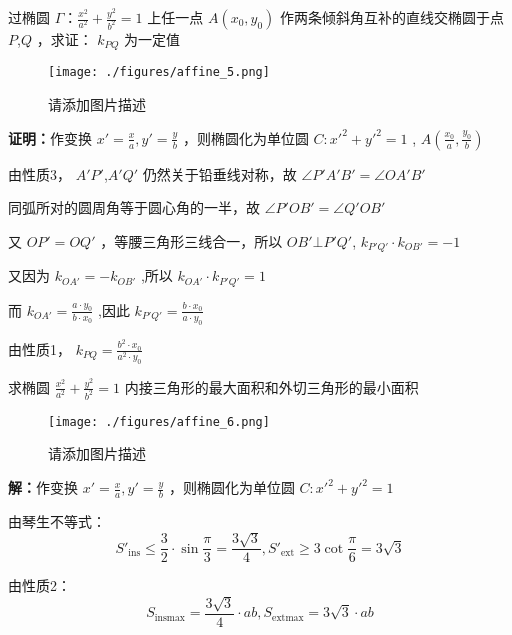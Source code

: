 \begin{corollary}{}
过椭圆 $\displaystyle{\Gamma：\frac{x^2}{a^2}+\frac{y^2}{b^2}=1}$ 上任一点 $\displaystyle{A(x_0,y_0)}$ 作两条倾斜角互补的直线交椭圆于点 $\displaystyle{P}$,$\displaystyle{Q}$ ，求证： $\displaystyle{k_{PQ}}$ 为一定值
\begin{figure}[ht]
\centering
\texttt{[image: ./figures/affine\_5.png]}
\caption{请添加图片描述} \label{affine_fig5}
\end{figure}
\textbf{证明：}作变换 $\displaystyle{x'=\frac{x}{a},y'=\frac{y}{b}}$ ，则椭圆化为单位圆 $\displaystyle{C:x'^2+y'^2=1}$ , $\displaystyle{A\left(\frac{x_0}{a},\frac{y_0}{b}\right)}$ 

由性质3， $\displaystyle{A'P'}$,$\displaystyle{A'Q'}$ 仍然关于铅垂线对称，故 $\displaystyle{\angle P'A'B'=\angle OA'B'}$

同弧所对的圆周角等于圆心角的一半，故 $\displaystyle{\angle P'OB'=\angle Q'OB'}$

又 $\displaystyle{OP'=OQ'}$ ，等腰三角形三线合一，所以 $\displaystyle{OB'\bot P'Q' }$, $\displaystyle{k_{P'Q'}\cdot k_{OB'}=-1}$

又因为 $\displaystyle{k_{OA'}=-k_{OB'}}$ ,所以 $\displaystyle{k_{OA'}\cdot k_{P'Q'}=1}$

而 $\displaystyle{k_{OA'}=\frac{a\cdot y_0}{b\cdot x_0}}$ ,因此 $\displaystyle{k_{P'Q'}=\frac{b\cdot x_0}{a\cdot y_0}}$

由性质1， $\displaystyle{k_{PQ}=\frac{b^2\cdot x_0}{a^2 \cdot y_0}}$ 
\end{corollary}
\begin{corollary}{}
求椭圆 $\displaystyle{\frac{x^2}{a^2}+\frac{y^2}{b^2}=1}$ 内接三角形的最大面积和外切三角形的最小面积
\begin{figure}[ht]
\centering
\texttt{[image: ./figures/affine\_6.png]}
\caption{请添加图片描述} \label{affine_fig6}
\end{figure}
\textbf{解：}作变换 $\displaystyle{x'=\frac{x}{a},y'=\frac{y}{b}}$ ，则椭圆化为单位圆 $\displaystyle{C:x'^2+y'^2=1}$

由琴生不等式：
$$S'_{\text{ins}}\leq \frac{3}{2}\cdot \sin\frac{\pi}{3}=\frac{3\sqrt{3}}{4}, S'_{\text{ext}}\geq 3\cot\frac{\pi}{6}=3\sqrt{3}$$ 

由性质2： 
$$S_{\text{ins}\max}=\frac{3\sqrt{3}}{4}\cdot ab, S_{\text{ext}\max}=3\sqrt{3}\cdot ab$$ 

\end{corollary}
